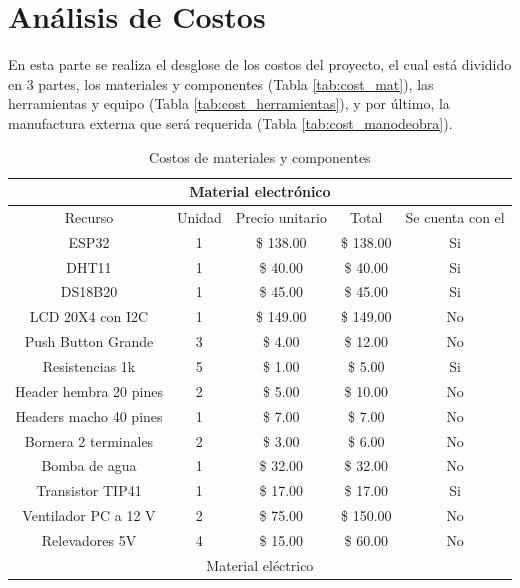 \section{Análisis de Costos}

En esta parte se realiza el desglose de los costos del proyecto, el cual está dividido en 3 partes, los materiales y componentes (Tabla \ref{tab:cost_mat}), las herramientas y equipo (Tabla \ref{tab:cost_herramientas}), y por último, la manufactura externa que será requerida (Tabla \ref{tab:cost_manodeobra}).

    \begin{table}[h!]
        \begin{center}
            \caption{Costos de materiales y componentes}
            \begin{tabular}{ | c | c | c | c | c |}
               \multicolumn{5}{c}{Material electrónico}\\ \hline
                Recurso & Unidad & Precio unitario & Total & Se cuenta con el  \\ \hline
                ESP32 & 1 & \$ 138.00 & \$ 138.00 & Si \\ \hline
                DHT11 & 1 & \$ 40.00 & \$ 40.00 & Si \\ \hline
                DS18B20  & 1 & \$ 45.00 & \$ 45.00 & Si  \\ \hline
                LCD 20X4 con I2C  & 1 & \$ 149.00 & \$ 149.00 & No  \\ \hline
                Push Button Grande  & 3 & \$ 4.00 & \$ 12.00 & No  \\ \hline
                Resistencias 1k  & 5 & \$ 1.00 & \$ 5.00 & Si  \\ \hline
                Header hembra 20 pines  & 2 & \$ 5.00 & \$ 10.00 & No  \\ \hline
                Headers macho 40 pines  & 1 & \$ 7.00 & \$ 7.00 & No  \\ \hline
                Bornera 2 terminales  & 2 & \$ 3.00 & \$ 6.00 & No  \\ \hline
                Bomba de agua  & 1 & \$ 32.00 & \$ 32.00 & No  \\ \hline
                Transistor TIP41  & 1 & \$ 17.00  & \$ 17.00 & Si  \\ \hline
                Ventilador PC a 12 V  & 2 & \$ 75.00 & \$ 150.00 & No  \\ \hline
                Relevadores 5V  & 4 & \$ 15.00 & \$ 60.00 & No  \\ \hline
                \multicolumn{5}{c}{Material eléctrico}\\ \hline

\end{tabular}
\end{center}
\end{table}
